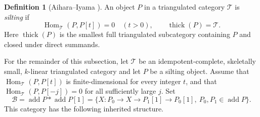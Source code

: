 \documentclass[pdflatex,sn-mathphys-num]{sn-jnl}
\numberwithin{equation}{section}
\theoremstyle{definition}
\newtheorem{definition}[theorem]{Definition}
\theoremstyle{remark}\newtheorem{remark}[theorem]{Remark}
\newcommand{\Hom}{\operatorname{Hom}}
\newcommand{\add}{\operatorname{add}}
\begin{document}
\begin{definition}[{Aihara--Iyama \cite[Section 2]{AI}}]\label{def:silting}
An object $P$ in a triangulated category $\mathcal T$ is
\emph{silting} if
\[
 \Hom_{\mathcal T}(P,P[t])=0\quad(t>0),\qquad
 \operatorname{thick}(P)=\mathcal T.
\]
Here $\operatorname{thick}(P)$ is the smallest full triangulated
subcategory containing $P$ and closed under direct summands.
\end{definition}

For the remainder of this subsection, let $\mathcal T$ be an
idempotent-complete, skeletally small, $k$-linear triangulated
category and let $P$ be a silting object. Assume that
$\Hom_{\mathcal T}(P,P[t])$ is finite-dimensional for every integer
$t$, and that $\Hom_{\mathcal T}(P,P[-j])=0$ for all sufficiently
large $j$. Set
\[
 \mathcal B=\add P*\add P[1]
   =\{X:P_0\to X\to P_1[1]\to P_0[1],\ P_0,P_1\in\add P\}.
\]
This category has the following inherited structure.
\end{document}
